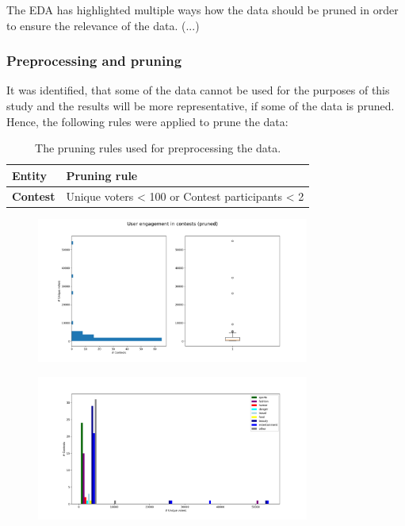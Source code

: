     The EDA has highlighted multiple ways how the data should be pruned in order to ensure the relevance of the data. (...)

    \subsubsection{Preprocessing and pruning}
    It was identified, that some of the data cannot be used for the purposes of this study and the results will be more representative, if some of the data is pruned. Hence, the following rules were applied to prune the data:

    \begin {table}[]
        \centering
        \begin{tabular}{l|l}
            \textbf{Entity}              & \textbf{Pruning rule} \\
            \hline
            \textbf{Contest}             & Unique voters < 100 or Contest participants < 2
        \end{tabular}
        \caption{The pruning rules used for preprocessing the data.}
        \label{contest_preprocessing_rules}
    \end{table}

    \begin{figure}[h] 
        \begin{center}
            \includegraphics[width=0.8\textwidth]{Images/user_engagement_in_contests-pruned.png}
            \caption{}
            \label{}
        \end{center}
    \end{figure}

    \begin{figure}[h] 
        \begin{center}
            \includegraphics[width=0.8\textwidth]{Images/user_engagement_in_categories_bar-pruned.png}
            \caption{}
            \label{}
        \end{center}
    \end{figure}
    
